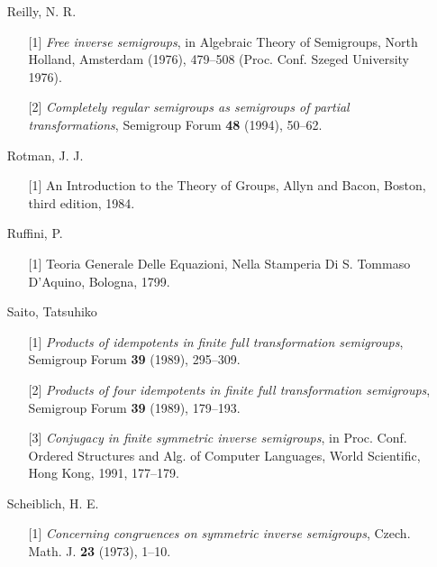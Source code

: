 \documentclass{surv-l}
\numberwithin{equation}{section}
\numberwithin{table}{section}
\numberwithin{figure}{section}
\theoremstyle{definition}
\begin{document}
\begin{enumerate}
\item[] Reilly, N. R.
\begin{enumerate}
\item[\hypertarget{bib64}{[1]}] \emph{Free inverse semigroups}, in Algebraic Theory of
Semigroups, North Holland, Amsterdam (1976), 479--508
(Proc. Conf. Szeged University 1976).

\item[\hypertarget{bib64a}{[2]}] \emph{Completely regular semigroups as semigroups of
partial transformations}, Semigroup Forum \textbf{48}
(1994), 50--62.
\end{enumerate}

\item[] Rotman, J. J.
\begin{enumerate}
\item[\hypertarget{bib65}{[1]}] An Introduction to the Theory of Groups, Allyn and Bacon,
Boston, third edition, 1984.
\end{enumerate}

\item[] Ruffini, P.
\begin{enumerate}
\item[\hypertarget{bib66}{[1]}] Teoria Generale Delle Equazioni, Nella Stamperia Di S.
Tommaso D'Aquino, Bologna, 1799.
\end{enumerate}

\item[] Saito, Tatsuhiko
\begin{enumerate}
\item[\hypertarget{bib67}{[1]}] \emph{Products of idempotents in finite full
transformation semigroups}, Semigroup Forum \textbf{39}
(1989), 295--309.

\item[\hypertarget{bib67a}{[2]}] \emph{Products of four idempotents in finite full
transformation semigroups}, Semigroup Forum \textbf{39}
(1989), 179--193.

\item[\hypertarget{bib67b}{[3]}] \emph{Conjugacy in finite symmetric inverse
semigroups}, in Proc. Conf. Ordered Structures and Alg. of
Computer Languages, World Scientific, Hong Kong, 1991,
177--179.
\end{enumerate}

\item[] Scheiblich, H. E.
\begin{enumerate}
\item[\hypertarget{bib68}{[1]}] \emph{Concerning congruences on symmetric inverse
semigroups}, Czech. Math. J. \textbf{23} (1973), 1--10.
\end{enumerate}


\end{enumerate}
\end{document}
